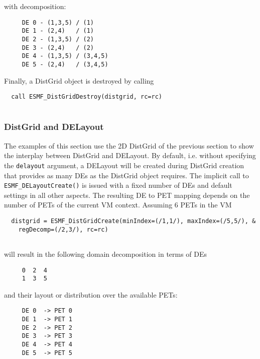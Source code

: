    with decomposition:
   \begin{verbatim}
     DE 0 - (1,3,5) / (1)
     DE 1 - (2,4)   / (1)
     DE 2 - (1,3,5) / (2)
     DE 3 - (2,4)   / (2)
     DE 4 - (1,3,5) / (3,4,5)
     DE 5 - (2,4)   / (3,4,5)
   \end{verbatim}
  
   Finally, a DistGrid object is destroyed by calling 

 \begin{verbatim}
  call ESMF_DistGridDestroy(distgrid, rc=rc)
 
\end{verbatim}
 

   \subsubsection{DistGrid and DELayout}
   
   The examples of this section use the 2D DistGrid of the previous section 
   to show the interplay between DistGrid and DELayout. By default, i.e.
   without specifying the {\tt delayout} argument, a DELayout will be created
   during DistGrid creation that provides as many DEs as the DistGrid
   object requires. The implicit call to {\tt ESMF\_DELayoutCreate()} is issued
   with a fixed number of DEs and default settings in all other aspects. The
   resulting DE to PET mapping depends on the number of PETs of the current VM
   context. Assuming 6 PETs in the VM 

 \begin{verbatim}
  distgrid = ESMF_DistGridCreate(minIndex=(/1,1/), maxIndex=(/5,5/), &
    regDecomp=(/2,3/), rc=rc)
 
\end{verbatim}
 

   will result in the following domain decomposition in terms of DEs
   \begin{verbatim}
     0  2  4
     1  3  5
   \end{verbatim}
   and their layout or distribution over the available PETs:
   \begin{verbatim}
     DE 0  -> PET 0
     DE 1  -> PET 1
     DE 2  -> PET 2
     DE 3  -> PET 3
     DE 4  -> PET 4
     DE 5  -> PET 5
   \end{verbatim}
   
